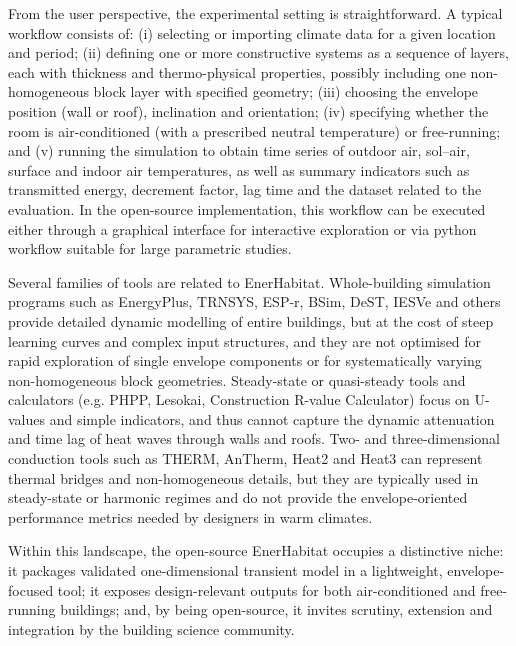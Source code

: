 \documentclass[preprint,12pt, a4paper]{elsarticle}
\begin{document}
From the user perspective, the experimental setting is straightforward. A typical workflow consists of: (i) selecting or importing climate data for a given location and period; (ii) defining one or more constructive systems as a sequence of layers, each with thickness and thermo-physical properties, possibly including one non-homogeneous block layer with specified geometry; (iii) choosing the envelope position (wall or roof), inclination and orientation; (iv) specifying whether the room is air-conditioned (with a prescribed neutral temperature) or free-running; and (v) running the simulation to obtain time series of outdoor air, sol–air, surface and indoor air temperatures, as well as summary indicators such as transmitted energy, decrement factor, lag time and the dataset related to the evaluation. In the open-source implementation, this workflow can be executed either through a graphical interface for interactive exploration or via python workflow  suitable for large parametric studies.

Several families of tools are related to EnerHabitat. Whole-building simulation programs such as EnergyPlus, TRNSYS, ESP-r, BSim, DeST, IESVe and others provide detailed dynamic modelling of entire buildings, but at the cost of steep learning curves and complex input structures, and they are not optimised for rapid exploration of single envelope components or for systematically varying non-homogeneous block geometries. Steady-state or quasi-steady tools and calculators (e.g. PHPP, Lesokai, Construction R-value Calculator) focus on U-values and simple indicators, and thus cannot capture the dynamic attenuation and time lag of heat waves through walls and roofs. Two- and three-dimensional conduction tools such as THERM, AnTherm, Heat2 and Heat3 can represent thermal bridges and non-homogeneous details, but they are typically used in steady-state or harmonic regimes and do not provide the envelope-oriented performance metrics needed by designers in warm climates. 

Within this landscape, the open-source EnerHabitat occupies a distinctive niche: it packages validated one-dimensional transient model in a lightweight, envelope-focused tool; it exposes design-relevant outputs for both air-conditioned and free-running buildings; and, by being open-source, it invites scrutiny, extension and integration by the building science community. 
\end{document}
